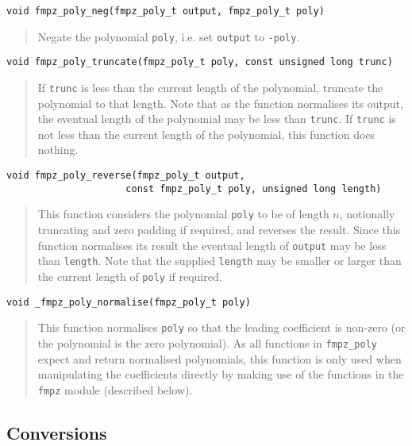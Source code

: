\documentclass[a4paper,10pt]{article}
\newcommand{\code}{\lstinline}
\begin{document}
\begin{lstlisting}
void fmpz_poly_neg(fmpz_poly_t output, fmpz_poly_t poly) 
\end{lstlisting}
\begin{quote}
Negate the polynomial \code{poly}, i.e. set \code{output} to \code{-poly}.
\end{quote}

\begin{lstlisting}
void fmpz_poly_truncate(fmpz_poly_t poly, const unsigned long trunc)
\end{lstlisting}
\begin{quote}
If \code{trunc} is less than the current length of the polynomial, truncate the polynomial to that length. Note that as the function normalises its output, the eventual length of the polynomial may be less than \code{trunc}. If \code{trunc} is not less than the current length of the polynomial, this function does nothing.
\end{quote}

\begin{lstlisting}
void fmpz_poly_reverse(fmpz_poly_t output, 
                     const fmpz_poly_t poly, unsigned long length) 
\end{lstlisting}
\begin{quote}
This function considers the polynomial \code{poly} to be of length $n$, notionally truncating and zero padding if required, and reverses the result. Since this function normalises its result the eventual length of \code{output} may be less than \code{length}. Note that the supplied \code{length} may be smaller or larger than the current length of \code{poly} if required.
\end{quote}

\begin{lstlisting}
void _fmpz_poly_normalise(fmpz_poly_t poly) 
\end{lstlisting}
\begin{quote}
This function normalises \code{poly} so that the leading coefficient is non-zero (or the polynomial is the zero polynomial). As all functions in \code{fmpz_poly} expect and return normalised polynomials, this function is only used when manipulating the coefficients directly by making use of the functions in the \code{fmpz} module (described below).
\end{quote}

\subsection{Conversions}
\end{document}
